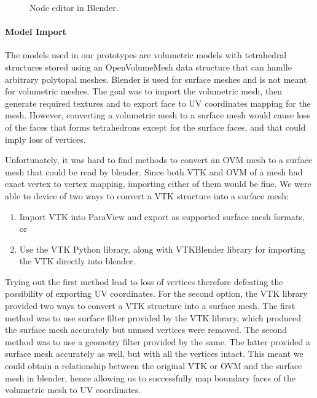 \begin{figure}
  \centering%
  \setlength{\fboxsep}{0pt}%
  \setlength{\fboxrule}{0.1pt}%
  \caption{Node editor in Blender.}\label{fig:blender}
\end{figure}

\paragraph{Model Import}
The models used in our prototypes are volumetric models with tetrahedral structures stored using an OpenVolumeMesh data structure that can handle arbitrary polytopal meshes. Blender is used for surface meshes and is not meant for volumetric meshes. The goal was to import the volumetric mesh, then generate required textures and to export face to UV coordinates mapping for the mesh. However, converting a volumetric mesh to a surface mesh would cause loss of the faces that forms tetrahedrons except for the surface faces, and that could imply loss of vertices.

Unfortunately, it was hard to find methods to convert an OVM mesh to a surface mesh that could be read by blender. Since both VTK and OVM of a mesh had exact vertex to vertex mapping, importing either of them would be fine. We were able to device of two ways to convert a VTK structure into a surface mesh:

\begin{enumerate}[1.]
  \item Import VTK into ParaView and export as supported surface mesh formats, or
  \item Use the VTK Python library, along with VTKBlender library for importing the VTK directly into blender.
\end{enumerate}

Trying out the first method lead to loss of vertices therefore defeating the possibility of exporting UV coordinates. For the second option, the VTK library provided two ways to convert a VTK structure into a surface mesh. The first method was to use surface filter provided by the VTK library, which produced the surface mesh accurately but unused vertices were removed. The second method was to use a geometry filter provided by the same. The latter provided a surface mesh accurately as well, but with all the vertices intact. This meant we could obtain a relationship between the original VTK or OVM and the surface mesh in blender, hence allowing us to successfully map boundary faces of the volumetric mesh to UV coordinates.

